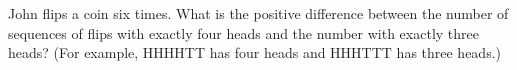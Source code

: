 John flips a coin six times. What is the positive difference between the number of sequences of flips with exactly four heads and the number with exactly three heads? (For example, HHHHTT has four heads and HHHTTT has three heads.)
